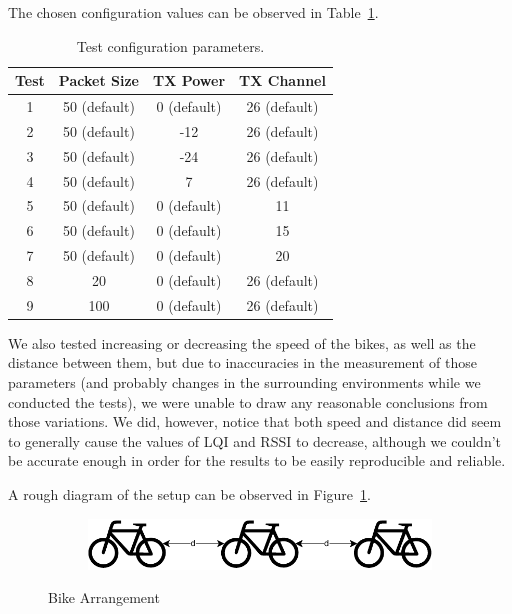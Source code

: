 \documentclass[runningheads]{llncs}
\begin{document}
The chosen configuration values can be observed in Table~\ref{table:1}.

\vspace{0.5cm}

\begin{table}[h!]
    \centering
    \begin{tabular}{| c|c| c| c|} 
    \hline
     \textbf{Test} & \textbf{Packet Size} & \textbf{TX Power} & \textbf{TX Channel} \\ [0.5ex] 
    \hline
     1 & 50 (default) & 0 (default) & 26 (default) \\ 
     \hline
     2 & 50 (default) & -12 & 26 (default) \\
     \hline
     3 & 50 (default) & -24 & 26 (default) \\
     \hline
     4 & 50 (default) & 7 & 26 (default) \\
     \hline
     5 & 50 (default) & 0 (default) & 11 \\
     \hline
     6 & 50 (default) & 0 (default) & 15 \\
     \hline
     7 & 50 (default) & 0 (default) & 20 \\
     \hline
     8 & 20  & 0 (default) & 26 (default) \\
     \hline
     9 & 100 & 0 (default) & 26 (default) \\
     \hline
    \end{tabular}
    \vspace*{0.2cm}
    \caption{Test configuration parameters.}
    \label{table:1}
    \end{table}

We also tested increasing or decreasing the speed of the bikes, as well as the distance between them, but due to inaccuracies in the measurement of those parameters (and probably changes in the surrounding environments while we conducted the tests), we were unable to draw any reasonable conclusions from those variations. We did, however, notice that both speed and distance did seem to generally cause the values of LQI and RSSI to decrease, although we couldn't be accurate enough in order for the results to be easily reproducible and reliable.

A rough diagram of the setup can be observed in Figure~\ref{fig:1}.

\vspace{0.5cm}

\begin{figure}[H]
    \centering
    \begin{subfigure}[b]{0.45\textwidth}
        \centering
        \includegraphics[width=\textwidth]{images/bike-diagram-cropped.pdf}
    \end{subfigure}
    \caption{Bike Arrangement}
    \label{fig:1}
\end{figure}
\end{document}
